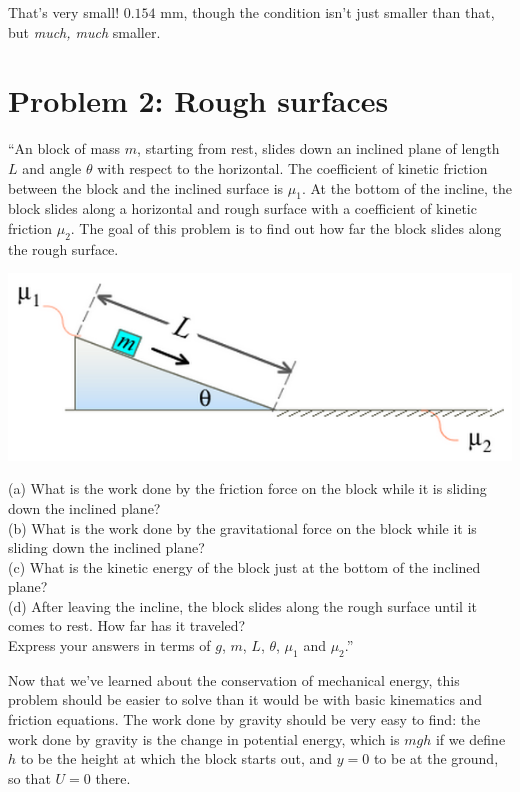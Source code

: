 \documentclass[12pt,a4paper]{report}
\begin{document}
That's very small! $0.154$ mm, though the condition isn't just smaller than that, but \emph{much, much} smaller.

\section{Problem 2: Rough surfaces}

``An block of mass $m$, starting from rest, slides down an inclined plane of length $L$ and angle $\theta$ with respect to the horizontal. The coefficient of kinetic friction between the block and the inclined surface is $\mu_1$. At the bottom of the incline, the block slides along a horizontal and rough surface with a coefficient of kinetic friction $\mu_2$. The goal of this problem is to find out how far the block slides along the rough surface.

\begin{center}
\includegraphics[scale=0.7]{Graphics/h4p2}
\end{center}

(a) What is the work done by the friction force on the block while it is sliding down the inclined plane?\\
(b) What is the work done by the gravitational force on the block while it is sliding down the inclined plane?\\
(c) What is the kinetic energy of the block just at the bottom of the inclined plane?\\
(d) After leaving the incline, the block slides along the rough surface until it comes to rest. How far has it traveled?\\
Express your answers in terms of $g$, $m$, $L$, $\theta$, $\mu_1$ and $\mu_2$.''

Now that we've learned about the conservation of mechanical energy, this problem should be easier to solve than it would be with basic kinematics and friction equations. The work done by gravity should be very easy to find: the work done by gravity is the change in potential energy, which is $m g h$ if we define $h$ to be the height at which the block starts out, and $y = 0$ to be at the ground, so that $U = 0$ there.
\end{document}
